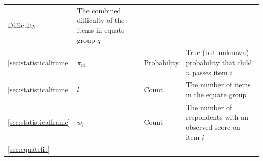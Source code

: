 \documentclass[
]{book}
\begin{document}
\begin{longtable}[]{@{}llll@{}}
\begin{minipage}[t]{0.13\columnwidth}
Difficulty\strut
\end{minipage} & \begin{minipage}[t]{0.53\columnwidth}\raggedright
The combined difficulty of the items in equate group \(q\)\strut
\end{minipage}\tabularnewline
\begin{minipage}[t]{0.10\columnwidth}\raggedright
\ref{sec:statisticalframe}\strut
\end{minipage} & \begin{minipage}[t]{0.13\columnwidth}\raggedright
\(\pi_{ni}\)\strut
\end{minipage} & \begin{minipage}[t]{0.13\columnwidth}\raggedright
Probability\strut
\end{minipage} & \begin{minipage}[t]{0.53\columnwidth}\raggedright
True (but unknown) probability that child \(n\) passes item \(i\)\strut
\end{minipage}\tabularnewline
\begin{minipage}[t]{0.10\columnwidth}\raggedright
\ref{sec:statisticalframe}\strut
\end{minipage} & \begin{minipage}[t]{0.13\columnwidth}\raggedright
\(l\)\strut
\end{minipage} & \begin{minipage}[t]{0.13\columnwidth}\raggedright
Count\strut
\end{minipage} & \begin{minipage}[t]{0.53\columnwidth}\raggedright
The number of items in the equate group\strut
\end{minipage}\tabularnewline
\begin{minipage}[t]{0.10\columnwidth}\raggedright
\ref{sec:statisticalframe}\strut
\end{minipage} & \begin{minipage}[t]{0.13\columnwidth}\raggedright
\(w_i\)\strut
\end{minipage} & \begin{minipage}[t]{0.13\columnwidth}\raggedright
Count\strut
\end{minipage} & \begin{minipage}[t]{0.53\columnwidth}\raggedright
The number of respondents with an observed score on item \(i\)\strut
\end{minipage}\tabularnewline
\begin{minipage}[t]{0.10\columnwidth}\raggedright
\ref{sec:equatefit}\strut
\end{minipage} & \begin{minipage}[t]{0.13\columnwidth}\raggedright

\end{minipage}
\end{longtable}
\end{document}
